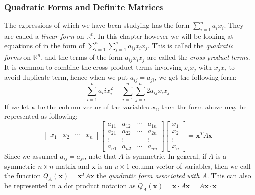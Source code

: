 \documentclass{report}
\begin{document}
		\subsubsection{Quadratic Forms and Definite Matrices}
		The expressions of which we have been studying has the form $\sum_{i=1}^{n}a_ix_i$. They are called a \emph{linear form} on $\mathbb{R}^n$. In this chapter however we will be looking at equations of in the form of $\sum_{i=1}^{n}\sum_{j=1}^{n}a_{ij}x_ix_j$. This is called the \emph{quadratic forms} on $\mathbb{R}^n$, and the terms of the form $a_{ij}x_ix_j$ are called the \emph{cross product terms}. It is common to combine the cross product terms involving $x_ix_j$ with $x_jx_i$ to avoid duplicate term, hence when we put $a_{ij}=a_{ji}$, we get the following form:
		\begin{displaymath}
		\sum_{i=1}^{n}a_iix_i^2 + \sum_{i=1}^{n}\sum_{j=i}^{n}2a_{ij}x_ix_j
		\end{displaymath}
		If we let $\bm{x}$ be the column vector of the variables $x_i$, then the form above may be represented as following:
		\begin{displaymath}
		\begin{bmatrix}
		x_1 & x_2 & \cdots & x_n
		\end{bmatrix}
		\begin{bmatrix}
		a_{11} & a_{12} & \cdots & a_{1n} \\
		a_{21} & a_{22} & \cdots & a_{2n} \\
		\vdots & \vdots &       & \vdots \\
		a_{n1} & a_{n2} & \cdots & a_{nn}
		\end{bmatrix}
		\begin{bmatrix}
		x_1 \\ x_2 \\ \vdots \\ x_n
		\end{bmatrix}
		=\bm{x}^TA\bm{x}
		\end{displaymath}
		Since we assumed $a_{ij}=a_{ji}$, note that $A$ is symmetric. In general, if $A$ is a symmetric $n \times n$ matrix and $\bm{x}$ is an $n \times 1$ column vector of variables, then we call the function $Q_A(\bm{x})=\bm{x}^TA\bm{x}$ the \emph{quadratic form associated with $A$}. This can also be represented in a dot product notation as $Q_A(\bm{x})=\bm{x} \cdot A\bm{x}=A\bm{x} \cdot \bm{x}$
		
\end{document}

